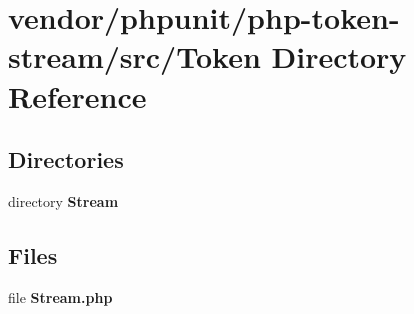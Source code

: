 \section{vendor/phpunit/php-\/token-\/stream/src/\+Token Directory Reference}
\label{dir_1af6230b51813508071e769cd28c39d6}
\subsection*{Directories}
\begin{DoxyCompactItemize}
\item 
directory {\bf Stream}
\end{DoxyCompactItemize}
\subsection*{Files}
\begin{DoxyCompactItemize}
\item 
file {\bf Stream.\+php}
\end{DoxyCompactItemize}
